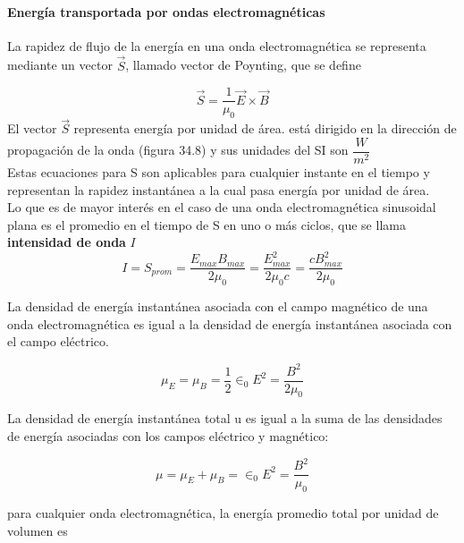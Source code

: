 \documentclass[10pt]{article}
\begin{document}
\paragraph{Energía transportada por ondas electromagnéticas}

La rapidez de flujo de la energía en una onda electromagnética se representa mediante un vector $\overrightarrow{S}$, 
llamado vector de Poynting, que se define

\begin{equation*}
	\overrightarrow{S} = \dfrac{1}{\mu_0} \overrightarrow{E} \times \overrightarrow{B}
\end{equation*}
El vector $\overrightarrow{S}$ representa energía por unidad de área.  está
dirigido en la dirección de propagación de la onda (figura 34.8) y sus unidades del SI
son $\dfrac{W}{m^2}$\\
\linebreak
Estas ecuaciones para S son aplicables para cualquier instante en el tiempo y representan
la rapidez instantánea a la cual pasa energía por unidad de área.\\
\linebreak
Lo que es de mayor interés en el caso de una onda electromagnética sinusoidal plana
es el promedio en el tiempo de S en uno o más ciclos, que se llama \textbf{intensidad de onda} $I$\\
\begin{equation*}
I = S_{prom} = \dfrac{E_{max}B_{max}}{2\mu_0} = \dfrac{E^2_{max}}{2\mu_0 c} = \dfrac{cB^2_{max}}{2\mu_0}
\end{equation*}

La densidad de energía instantánea asociada con el campo magnético de una
onda electromagnética es igual a la densidad de energía instantánea asociada con el campo eléctrico.

\begin{equation*}
	\mu_E = \mu_B = \frac{1}{2} \in_0 E^2 = \dfrac{B^2}{2\mu_0}
\end{equation*}

La densidad de energía instantánea total u es igual a la suma de las densidades de
energía asociadas con los campos eléctrico y magnético:

\begin{equation*}
	\mu = \mu_E + \mu_B = \in_0 E^2 = \dfrac{B^2}{\mu_0}
\end{equation*}

para
cualquier onda electromagnética, la energía promedio total por unidad de volumen es
\end{document}
